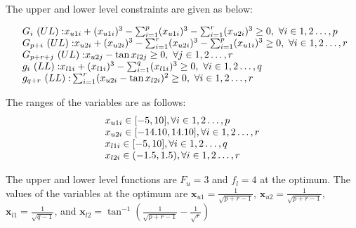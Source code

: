 The upper and lower level constraints are given as below:

\begin{equation}
\begin{array}{lr}
\text{}\hspace{2mm} {G_i~(UL):} x_{u1i}+ (x_{u1i})^{3} - \sum_{i=1}^{p} (x_{u1i})^{3} -\sum_{	i=1}^{r} (x_{u2i})^{3}\geq 0,~\forall i \in {1,2\ldots,p} \\
\text{}\hspace{2mm} {G_{p+i}~(UL):} x_{u2i}+ (x_{u2i})^{3} - \sum_{i=1}^{r} (x_{u2i})^{3} -\sum_{	i=1}^{p} (x_{u1i})^{3}\geq 0,~\forall i \in {1,2\ldots,r} \\

\text{}\hspace{2mm} {G_{p+r+j}~(UL):} x_{u2j}- \tan x_{l2j} \geq 0,~\forall j \in {1,2\ldots,r} \\


\text{}\hspace{2mm} {g_i~(LL):} x_{l1i}+ (x_{l1i})^{3} - \sum_{i=1}^{q} (x_{l1i})^{3} \geq 0,~\forall i \in {1,2\ldots,q} \\
\text{}\hspace{2mm} {g_{q+r}~(LL):}  \sum_{i=1}^{r} (x_{u2i}-\tan x_{l2i})^{2} \geq 0,~\forall i \in {1,2\ldots,r} \\

\end{array}
\label{smd_12_con}
\end{equation}


The ranges of the variables are as follows:
\begin{equation}
\begin{array}{lr}
$$x_{u1i} \in  [-5,10],          \forall i \in {1,2\ldots,p}$$\\
$$x_{u2i} \in  [-14.10,14.10],          \forall i \in {1,2\ldots,r}$$\\
$$x_{l1i} \in  [-5,10],          \forall i \in {1,2\ldots,q}$$\\
$$x_{l2i} \in  (-1.5,1.5),          \forall i \in {1,2\ldots,r}$$
\end{array}
\label{smd_12_boun}
\end{equation}	


The upper and lower level functions are $F_u=3$ and $f_l=4$  at the optimum. The values of the variables at the optimum are $\mathbf{x}_{u1}=\frac{1}{\sqrt{p+r-1}}$, $\mathbf{x}_{u2}=\frac{1}{\sqrt{p+r-1}}$, $\mathbf{x}_{l1}=\frac{1}{\sqrt{q-1}}$, and $\mathbf{x}_{l2}=\tan^{-1}(\frac{1}{\sqrt{p+r-1}}-\frac{1}{\sqrt{r}})$



